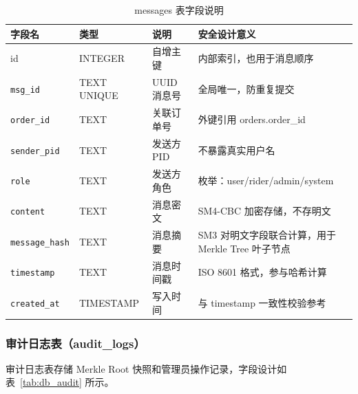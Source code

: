 \begin{table}[H]
\centering
\caption{messages 表字段说明}
\label{tab:db_messages}
\renewcommand{\arraystretch}{1.5}
\setlength{\tabcolsep}{6pt}
\begin{tabular}{L{3.2cm} L{2.5cm} L{3.3cm} L{4.5cm}}
\toprule
\textbf{字段名} & \textbf{类型} & \textbf{说明} & \textbf{安全设计意义} \\
\midrule
id              & INTEGER       & 自增主键               & 内部索引，也用于消息顺序 \\
\texttt{msg\_id}         & TEXT UNIQUE   & UUID 消息号            & 全局唯一，防重复提交 \\
\texttt{order\_id}       & TEXT          & 关联订单号             & 外键引用 orders.order\_id \\
\texttt{sender\_pid}     & TEXT          & 发送方 PID             & 不暴露真实用户名 \\
\texttt{role}            & TEXT          & 发送方角色             & 枚举：user/rider/admin/system \\
\texttt{content}         & TEXT          & 消息密文               & SM4-CBC 加密存储，不存明文 \\
\texttt{message\_hash}   & TEXT          & 消息摘要               & SM3 对明文字段联合计算，用于 Merkle Tree 叶子节点 \\
\texttt{timestamp}       & TEXT          & 消息时间戳             & ISO 8601 格式，参与哈希计算 \\
\texttt{created\_at}     & TIMESTAMP     & 写入时间               & 与 timestamp 一致性校验参考 \\
\bottomrule
\end{tabular}
\end{table}

\subsubsection*{审计日志表（audit\_logs）}

审计日志表存储 Merkle Root 快照和管理员操作记录，字段设计如表~\ref{tab:db_audit} 所示。

